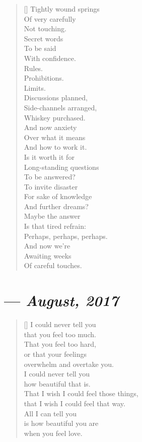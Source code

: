 \begin{verse}[\textwidth]
  Tightly wound springs\\
  Of very carefully\\
  Not touching.\\
  \vin Secret words\\
  \vin To be said\\
  \vin With confidence.\\
  Rules.\\
  Prohibitions.\\
  Limits.\\
  \vin Discussions planned,\\
  \vin Side-channels arranged,\\
  \vin Whiskey purchased.\\
  And now anxiety\\
  Over what it means\\
  And how to work it.\\
  \vin Is it worth it for\\
  \vin Long-standing questions\\
  \vin To be answered?\\
  To invite disaster\\
  For sake of knowledge\\
  And further dreams?\\
  \vin Maybe the answer\\
  \vin Is that tired refrain:\\
  \vin Perhaps, perhaps, perhaps.\\
  And now we're\\
  Awaiting weeks\\
  Of careful touches.
\end{verse}

\section{--- \textit{August, 2017}}

\begin{verse}[\textwidth]
I could never tell you\\
that you feel too much.\\
That you feel too hard,\\
or that your feelings\\
overwhelm and overtake you.\\

I could never tell you\\
how beautiful that is.\\
That I wish I could feel those things,\\
that I wish I could feel that way.\\

All I can tell you\\
is how beautiful you are\\
when you feel love.\\
\end{verse}
